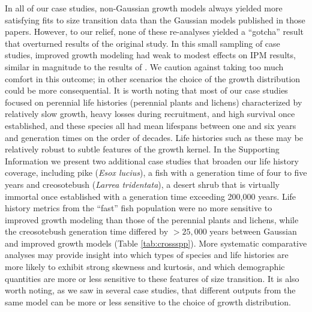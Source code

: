 \documentclass[12pt]{article}
\begin{document}
In all of our case studies, non-Gaussian growth models always yielded more satisfying fits to size transition data than the Gaussian models published in those papers. 
However, to our relief, none of these re-analyses yielded a ``gotcha'' result that overturned results of the original study. 
In this small sampling of case studies, improved growth modeling had weak to modest effects on IPM results, similar in magnitude to the results of \cite{peterson2019improving}. 
We caution against taking too much comfort in this outcome; in other scenarios the choice of the growth distribution could be more consequential. 
It is worth noting that most of our case studies focused on perennial life histories (perennial plants and lichens) characterized by relatively slow growth, heavy losses during recruitment, and high survival once established, and these species all had mean lifespans between one and six years and generation times on the order of decades. 
Life histories such as these may be relatively robust to subtle features of the growth kernel. 
In the Supporting Information we present two additional case studies that broaden our life history coverage, including pike (\emph{Esox lucius}), a fish with a generation time of four to five years and creosotebush (\emph{Larrea tridentata}), a desert shrub that is virtually immortal once established with a generation time exceeding 200,000 years. 
Life history metrics from the ``fast'' fish population were no more sensitive to improved growth modeling than those of the perennial plants and lichens, while the creosotebush generation time differed by $>25,000$ years between Gaussian and improved growth models (Table \ref{tab:crossspp}). 
More systematic comparative analyses may provide insight into which types of species and life histories are more likely to exhibit strong skewness and kurtosis, and which demographic quantities are more or less sensitive to these features of size transition. 
It is also worth noting, as we saw in several case studies, that different outputs from the same model can be more or less sensitive to the choice of growth distribution. 
\end{document}
